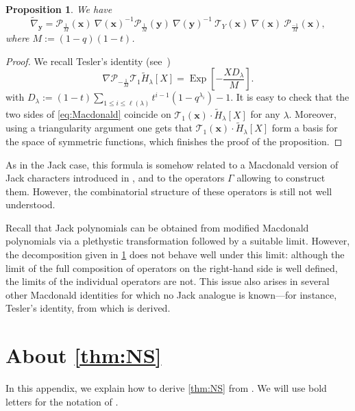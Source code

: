\documentclass[12pt]{amsart}
\newtheorem{prop}[thm]{Proposition}
\theoremstyle{remark}
\newcommand{\bfx}{\boldsymbol{x}}
\newcommand{\bfy}{\boldsymbol{y}}
\newcommand{\tH}{\widetilde{H}}
\newcommand{\nablaqt}{\nabla}
\newcommand{\dehsupernabla}{\widetilde{\nabla}_{\boldsymbol{y}}}
\newcommand{\Pop}{\mathcal{P}}
\newcommand{\Top}{\mathcal{T}}
\newcommand{\Topqt}{\mathcal{T}}
\DeclareMathOperator{\Exp}{Exp}
\begin{document}
\begin{prop}\label{prop:Macdonald}
    We have
    \begin{equation}\label{eq:Macdonald}
      \dehsupernabla=\Pop_{\frac{1}{M}}(\bfx)\ \nablaqt(\bfx)^{-1}\Pop_{\frac{1}{M}}(\bfy)\ \nablaqt(\bfy)^{-1}\ \Topqt_Y(\bfx)\ \nablaqt(\bfx)\ \Pop_{\frac{-1}{M}}(\bfx),
    \end{equation}
    where $M:=(1-q)(1-t)$.
\end{prop}
\begin{proof}
We recall Tesler's identity (see~\cite{GarsiaHaimanTesler2001})
    \begin{equation} \label{eq Tesler}
\nabla \Pop_{-\frac{1}{M}}\Top_{1} \widetilde{H}_\lambda[X]=\Exp\left[-\frac{XD_\lambda}{M} \right].
\end{equation}
with $D_\lambda:=(1-t)\sum_{1\leq i\leq \ell(\lambda)}t^{i-1}(1-q^{\lambda_i})-1.$
It is easy to check that the two sides of \cref{eq:Macdonald} coincide on 
$\Top_{1}(\bfx)\cdot \tH_{\lambda}[X]$ for any $\lambda$. Moreover, using a triangularity argument one gets that $\Top_{1}(\bfx)\cdot \tH_{\lambda}[X]$ form a basis for the space of symmetric functions, which finishes the proof of the proposition.
\end{proof}

As in the Jack case, this formula is somehow related to a Macdonald version of Jack characters introduced in \cite{BenDaliDAdderio2023}, and to the operators $\Gamma$ allowing to construct them. However, the combinatorial structure of these operators is still not well understood.

Recall that Jack polynomials can be obtained from modified Macdonald polynomials via a plethystic transformation followed by a suitable limit. However, the decomposition given in \cref{prop:Macdonald} does not behave well under this limit: although the limit of the full composition of operators on the right-hand side is well defined, the limits of the individual operators are not. This issue also arises in several other Macdonald identities for which no Jack analogue is known—for instance, Tesler’s identity, from which  is derived.



\section{About \texorpdfstring{\cref{thm:NS}}{}}\label{App:NS}
In this appendix, we explain how to derive \cref{thm:NS} from \cite[Theorem 2]{NazarovSklyanin2013}.
We will use bold letters for the notation of \cite{NazarovSklyanin2013}.
\end{document}
